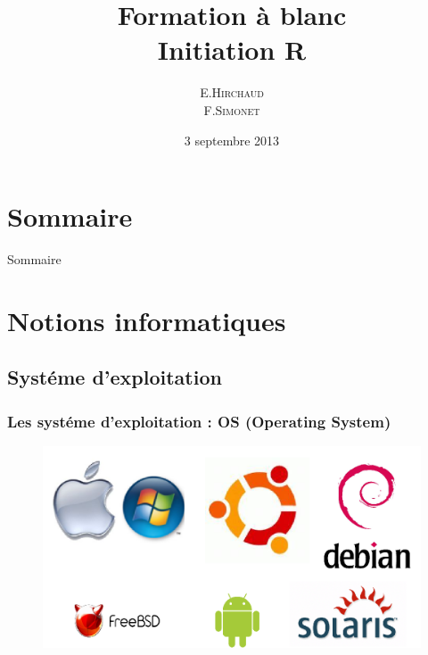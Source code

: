 \documentclass[table,svgnames,hyperref={pdfpagemode=FullScreen}]{beamer}
\title{Formation à blanc \\Initiation R}
\institute{BiRD}
\date{3 septembre 2013}
\author{\textsc{E.Hirchaud\\ F.Simonet}}
\begin{document}
\begin{frame}
	\titlepage
\end{frame}
	

\section*{Sommaire}
\begin{frame}{Sommaire}
	\small \tableofcontents
\end{frame}

\section{Notions informatiques}

\subsection{Systéme d'exploitation}
\begin{frame}
	\frametitle{Les systéme d'exploitation : OS (Operating System)}
	\begin{figure}
		\includegraphics[scale=0.55]{image/OSimage.png}
	\end{figure}
\end{frame}
\end{document}
